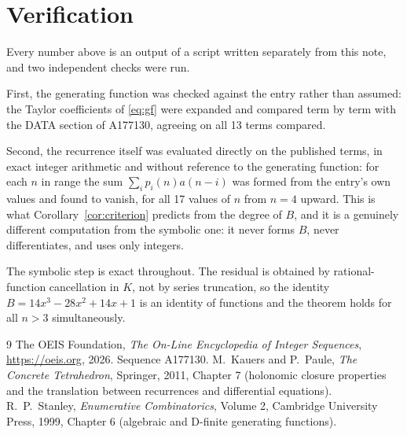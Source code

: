 \documentclass[11pt,a4paper]{article}
\theoremstyle{plain}
\theoremstyle{definition}
\begin{document}
\section{Verification}

Every number above is an output of a script written separately from this note, and two
independent checks were run.

First, the generating function was checked against the entry rather than assumed: the
Taylor coefficients of \eqref{eq:gf} were expanded and compared term by term with the DATA
section of A177130, agreeing on all 13 terms compared.

Second, the recurrence itself was evaluated directly on the published terms, in exact
integer arithmetic and without reference to the generating function: for each $n$ in range
the sum $\sum_{i}p_{i}(n)a(n-i)$ was formed from the entry's own values and found to
vanish, for all 17 values of $n$ from $n=4$ upward. This is what
Corollary~\ref{cor:criterion} predicts from the degree of $B$, and it is a genuinely
different computation from the symbolic one: it never forms $B$, never differentiates, and
uses only integers.

The symbolic step is exact throughout. The residual is obtained by rational-function
cancellation in $K$, not by series truncation, so the identity $B=14 x^{3} - 28 x^{2} + 14 x + 1$ is an
identity of functions and the theorem holds for all $n>3$ simultaneously.

\begin{thebibliography}{9}
 The OEIS Foundation, \emph{The On-Line Encyclopedia of Integer Sequences},
\url{https://oeis.org}, 2026. Sequence A177130.
 M.~Kauers and P.~Paule, \emph{The Concrete Tetrahedron}, Springer, 2011,
Chapter 7 (holonomic closure properties and the translation between recurrences and
differential equations).
 R.~P.~Stanley, \emph{Enumerative Combinatorics}, Volume 2, Cambridge
University Press, 1999, Chapter 6 (algebraic and D-finite generating functions).
\end{thebibliography}
\end{document}
